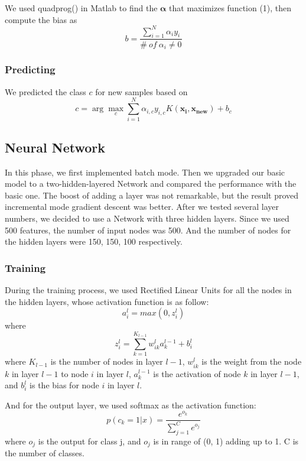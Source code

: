 \documentclass{article} %
\begin{document}
We used quadprog() in Matlab to find the $\mathbf{\alpha}$ that maximizes function (1), then compute the bias as
\begin{equation}
b=\frac{\sum_{i=1}^{N}\alpha_{i}y_{i}}{\#~of~\alpha_{i}\neq{0}}
\end{equation}

\subsubsection{Predicting}

We predicted the class $c$ for new samples based on
\begin{equation}
c=\arg\max_{c}\sum_{i=1}^{N}\alpha_{i,c}y_{i,c}K(\mathbf{x_{i}},\mathbf{x_{new}})+b_{c}
\end{equation}

\subsection{Neural Network}
In this phase, we first implemented batch mode. Then we upgraded our basic model to a two-hidden-layered Network and compared the performance with the basic one. The boost of adding a layer was not remarkable, but the result proved incremental mode gradient descent was better. After we tested several layer numbers, we decided to use a Network with three hidden layers. Since we used 500 features, the number of input nodes was 500. And the number of nodes for the hidden layers were 150, 150, 100 respectively.

\subsubsection{Training}
During the training process, we used Rectified Linear Units for all the nodes in the hidden layers, whose activation function is as follow:
\begin{equation}
a_{i}^{l}=max(0,z_{i}^{l})
\end{equation}
where
\begin{equation}
z_{i}^{l}=\sum_{k=1}^{K_{l-1}}w_{ik}^{l}a_k^{l-1}+b_{i}^{l}
\end{equation}
where $K_{l-1}$ is the number of nodes in layer $l-1$, $w_{ik}^{l}$ is the weight from the node $k$ in layer $l-1$ to node $i$ in layer $l$, $a_k^{l-1}$ is the activation of node $k$ in layer $l-1$, and $b_{i}^{l}$ is the bias for node $i$ in layer $l$.

And for the output layer, we used softmax as the activation function:
\begin{equation}
p(c_k=1|x) =  \frac{e^{o_k}}{\sum_{j=1}^{C}e^{o_j}}
\end{equation}
where $o_{j}$ is the output for class j, and $o_{j}$ is in range of (0, 1) adding up to 1. C is the number of classes. 
\end{document}
